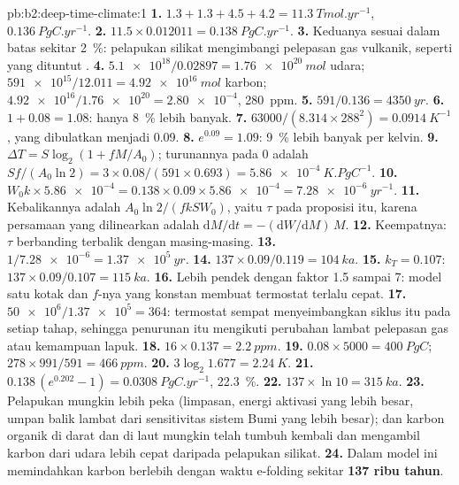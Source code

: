 \begin{solution}{pb:b2:deep-time-climate:1}
\textbf{1.} $1.3 + 1.3 + 4.5 + 4.2 = \qty{11.3}{Tmol.yr^{-1}}$, $\qty{0.136}{PgC.yr^{-1}}$.
\textbf{2.} $11.5\times0.012011 = \qty{0.138}{PgC.yr^{-1}}$.
\textbf{3.} Keduanya sesuai dalam batas sekitar \qty{2}{\percent}: pelapukan silikat mengimbangi pelepasan gas
vulkanik, seperti yang dituntut .
\textbf{4.} $\num{5.1e18}/0.02897 = \qty{1.76e20}{mol}$ udara; $\num{591e15}/12.011 =
\qty{4.92e16}{mol}$ karbon; $\num{4.92e16}/\num{1.76e20} = \num{2.80e-4}$, \qty{280}{ppm}.
\textbf{5.} $591/0.136 = \qty{4350}{yr}$.
\textbf{6.} $1 + 0.08 = 1.08$: hanya \qty{8}{\percent} lebih banyak.
\textbf{7.} $63000/(8.314\times288^2) = \qty{0.0914}{K^{-1}}$, yang dibulatkan menjadi 0.09.
\textbf{8.} $e^{0.09} = 1.09$: \qty{9}{\percent} lebih banyak per kelvin.
\textbf{9.} $\Delta T = S\log_2(1 + fM/A_0)$; turunannya pada 0 adalah $Sf/(A_0\ln2) =
3\times0.08/(591\times0.693) = \qty{5.86e-4}{K.PgC^{-1}}$.
\textbf{10.} $W_0k\times\num{5.86e-4} = 0.138\times0.09\times\num{5.86e-4} = \qty{7.28e-6}{yr^{-1}}$.
\textbf{11.} Kebalikannya adalah $A_0\ln2/(fkSW_0)$, yaitu $\tau$ pada proposisi itu, karena
persamaan yang dilinearkan adalah $\mathrm dM/\mathrm dt = -(\mathrm dW/\mathrm dM)\,M$.
\textbf{12.} Keempatnya: $\tau$ berbanding terbalik dengan masing-masing.
\textbf{13.} $1/\num{7.28e-6} = \qty{1.37e5}{yr}$.
\textbf{14.} $137\times0.09/0.119 = \qty{104}{ka}$.
\textbf{15.} $k_T = 0.107$: $137\times0.09/0.107 = \qty{115}{ka}$.
\textbf{16.} Lebih pendek dengan faktor 1.5 sampai 7: model satu kotak dan $f$-nya yang konstan membuat
termostat terlalu cepat.
\textbf{17.} $\num{50e6}/\num{1.37e5} = 364$: termostat sempat menyeimbangkan siklus itu pada setiap
tahap, sehingga penurunan itu mengikuti perubahan lambat pelepasan gas atau kemampuan lapuk.
\textbf{18.} $16\times0.137 = \qty{2.2}{ppm}$.
\textbf{19.} $0.08\times5000 = \qty{400}{PgC}$; $278\times991/591 = \qty{466}{ppm}$.
\textbf{20.} $3\log_2 1.677 = \qty{2.24}{K}$.
\textbf{21.} $0.138\,(e^{0.202} - 1) = \qty{0.0308}{PgC.yr^{-1}}$, \qty{22.3}{\percent}.
\textbf{22.} $137\times\ln10 = \qty{315}{ka}$.
\textbf{23.} Pelapukan mungkin lebih peka (limpasan, energi aktivasi yang lebih besar, umpan balik
lambat dari sensitivitas sistem Bumi yang lebih besar); dan karbon organik di darat dan di laut mungkin telah tumbuh
kembali dan mengambil karbon dari udara lebih cepat daripada pelapukan silikat.
\textbf{24.} Dalam model ini  memindahkan karbon berlebih dengan
waktu e-folding sekitar \textbf{\qty[text-series-to-math=true]{137}{} ribu tahun}.
\end{solution}
